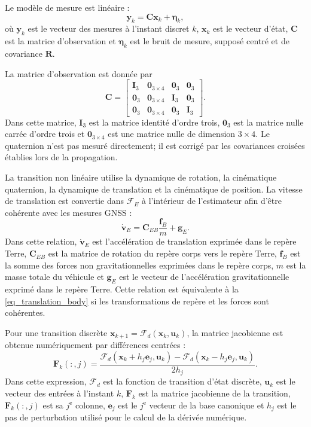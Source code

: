 \documentclass[11pt,a4paper,oneside]{report}
\newcommand{\vect}[1]{\bm{#1}}
\begin{document}
Le modèle de mesure est linéaire :
\begin{equation}
	\vect y_k=\mathbf C\vect x_k+\vect\eta_k,
	\label{eq_measurement_model}
\end{equation}
où $\vect y_k$ est le vecteur des mesures à l'instant discret $k$, $\vect x_k$ est le vecteur d'état, $\mathbf C$ est la matrice d'observation et $\vect\eta_k$ est le bruit de mesure, supposé centré et de covariance $\mathbf R$.

La matrice d'observation est donnée par
\begin{equation}
	\mathbf C=
	\begin{bmatrix}
		\mathbf I_3&\mathbf 0_{3\times4}&\mathbf 0_3&\mathbf 0_3\\
		\mathbf 0_3&\mathbf 0_{3\times4}&\mathbf I_3&\mathbf 0_3\\
		\mathbf 0_3&\mathbf 0_{3\times4}&\mathbf 0_3&\mathbf I_3
	\end{bmatrix}.
	\label{eq_measurement_matrix}
\end{equation}
Dans cette matrice, $\mathbf I_3$ est la matrice identité d'ordre trois, $\mathbf 0_3$ est la matrice nulle carrée d'ordre trois et $\mathbf 0_{3\times4}$ est une matrice nulle de dimension $3\times4$. Le quaternion n'est pas mesuré directement; il est corrigé par les covariances croisées établies lors de la propagation.

La transition non linéaire utilise la dynamique de rotation, la cinématique quaternion, la dynamique de translation et la cinématique de position. La vitesse de translation est convertie dans $\mathcal F_E$ à l'intérieur de l'estimateur afin d'être cohérente avec les mesures GNSS :
\begin{equation}
	\dot{\vect v}_E=\mathbf C_{EB}\frac{\vect f_B}{m}+\vect g_E.
	\label{eq_ekf_velocity_E}
\end{equation}
Dans cette relation, $\dot{\vect v}_E$ est l'accélération de translation exprimée dans le repère Terre, $\mathbf C_{EB}$ est la matrice de rotation du repère corps vers le repère Terre, $\vect f_B$ est la somme des forces non gravitationnelles exprimées dans le repère corps, $m$ est la masse totale du véhicule et $\vect g_E$ est le vecteur de l'accélération gravitationnelle exprimé dans le repère Terre. Cette relation est équivalente à la \cref{eq_translation_body} si les transformations de repère et les forces sont cohérentes.

Pour une transition discrète $\vect x_{k+1}=\mathcal F_d(\vect x_k,\vect u_k)$, la matrice jacobienne est obtenue numériquement par différences centrées :
\begin{equation}
	\mathbf F_k(:,j)=\frac{\mathcal F_d(\vect x_k+h_j\vect e_j,\vect u_k)-\mathcal F_d(\vect x_k-h_j\vect e_j,\vect u_k)}{2h_j}.
	\label{eq_numeric_jacobian}
\end{equation}
Dans cette expression, $\mathcal F_d$ est la fonction de transition d'état discrète, $\vect u_k$ est le vecteur des entrées à l'instant $k$, $\mathbf F_k$ est la matrice jacobienne de la transition, $\mathbf F_k(:,j)$ est sa $j^{\mathrm e}$ colonne, $\vect e_j$ est le $j^{\mathrm e}$ vecteur de la base canonique et $h_j$ est le pas de perturbation utilisé pour le calcul de la dérivée numérique.
\end{document}
